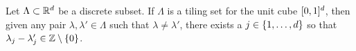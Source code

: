 \documentclass[../thesis.tex]{subfiles}
\begin{document}
\begin{theorem}\label{thrm:keller_tiling}
    Let $\Lambda \subset \mathbb{R}^d$ be a discrete subset. If $\Lambda$ is a tiling set for the unit cube $[0,1]^d$, then given any pair $\lambda, \lambda' \in \Lambda$ such that $\lambda\neq\lambda'$, there exists a $j\in \{1,\dots,d\}$ so that $\lambda_j -\lambda_j' \in \mathbb{Z}\setminus\{0\}$.
\end{theorem}
\end{document}
